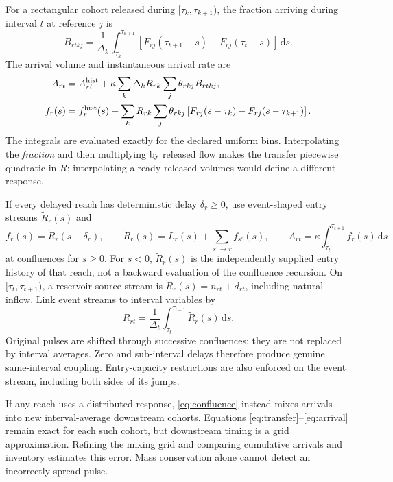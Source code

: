\documentclass[10pt,a4paper]{article}
\newcommand{\dd}{\,\mathrm{d}}
\begin{document}
For a rectangular cohort released during $[\tau_k,\tau_{k+1})$, the fraction
arriving during interval $t$ at reference $j$ is
\begin{equation}
B_{rtkj}=\frac1{\Delta_k}\int_{\tau_k}^{\tau_{k+1}}
  \left[F_{rj}(\tau_{t+1}-s)-F_{rj}(\tau_t-s)\right]\dd s.
\label{eq:transfer}
\end{equation}
The arrival volume and instantaneous arrival rate are
\begin{align}
A_{rt}&=A^{\rm hist}_{rt}
+\kappa\sum_k\Delta_k R_{rk}\sum_j\theta_{rkj}B_{rtkj},
\label{eq:arrival}\\
f_r(s)&=f_r^{\rm hist}(s)+
\sum_k R_{rk}\sum_j\theta_{rkj}
 \left[F_{rj}(s-\tau_k)-F_{rj}(s-\tau_{k+1})\right].
\label{eq:pointarrival}
\end{align}
The integrals are evaluated exactly for the declared uniform bins.
Interpolating the \emph{fraction} and then multiplying by released flow makes
the transfer piecewise quadratic in $R$; interpolating already released
volumes would define a different response.

If every delayed reach has deterministic delay $\delta_r\ge0$, use event-shaped
entry streams $\widetilde R_r(s)$ and
\begin{equation}
f_r(s)=\widetilde R_r(s-\delta_r),\qquad
\widetilde R_r(s)=L_r(s)+\sum_{s'\to r}f_{s'}(s),\qquad
A_{rt}=\kappa\int_{\tau_t}^{\tau_{t+1}}f_r(s)\dd s
\label{eq:deterministic}
\end{equation}
at confluences for $s\ge0$. For $s<0$, $\widetilde R_r(s)$ is the
independently supplied entry history of that reach, not a backward evaluation
of the confluence recursion. On $[\tau_t,\tau_{t+1})$, a reservoir-source
stream is $\widetilde R_r(s)=n_{rt}+d_{rt}$, including natural inflow.
Link event streams to interval variables by
\begin{equation}
R_{rt}=\frac1{\Delta_t}\int_{\tau_t}^{\tau_{t+1}}\widetilde R_r(s)\dd s.
\label{eq:eventmean}
\end{equation}
Original pulses are shifted through successive confluences; they are not
replaced by interval averages. Zero and sub-interval delays therefore
produce genuine same-interval coupling. Entry-capacity restrictions are
also enforced on the event stream, including both sides of its jumps.

If any reach uses a distributed response, \eqref{eq:confluence} instead
mixes arrivals into new interval-average downstream cohorts.
Equations \eqref{eq:transfer}--\eqref{eq:arrival} remain exact for each such
cohort, but downstream timing is a grid approximation. Refining the mixing
grid and comparing cumulative arrivals and inventory estimates this error.
Mass conservation alone cannot detect an incorrectly spread pulse.
\end{document}
